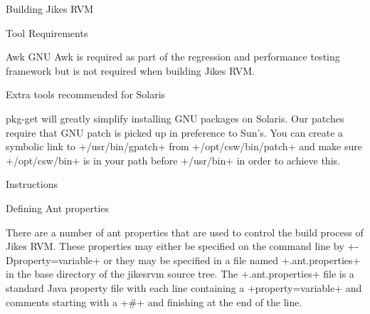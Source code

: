\begin{section}{Building Jikes RVM}
\begin{subsection}{Tool Requirements}
\begin{subsubsection}{Awk}
GNU Awk is required as part of the regression and performance testing framework but is not required when building Jikes RVM.

\end{subsubsection}

\end{subsection}

\begin{subsubsection}{Extra tools recommended for Solaris}

pkg-get will greatly simplify installing GNU packages on Solaris. Our patches require that GNU patch is picked up in preference to Sun's. You can create a symbolic link to \spverb+/usr/bin/gpatch+ from \spverb+/opt/csw/bin/patch+ and make sure \spverb+/opt/csw/bin+ is in your path before \spverb+/usr/bin+ in order to achieve this.

\end{subsubsection}

\begin{subsection}{Instructions}

\begin{subsubsection}{Defining Ant properties}

There are a number of ant properties that are used to control the build process of Jikes RVM. These properties may either be specified on the command line by \spverb+-Dproperty=variable+ or they may be specified in a file named \spverb+.ant.properties+ in the base directory of the jikesrvm source tree. The \spverb+.ant.properties+ file is a standard Java property file with each line containing a \spverb+property=variable+ and comments starting with a \spverb+#+ and finishing at the end of the line.


\end{subsubsection}
\end{subsection}
\end{section}
